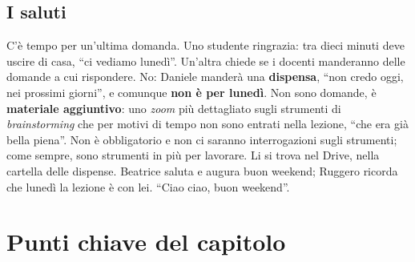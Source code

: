 \subsection{I saluti}
\label{a6:sec:saluti}

C'è tempo per un'ultima domanda. Uno studente ringrazia: tra dieci minuti deve uscire
di casa, ``ci vediamo lunedì''. Un'altra chiede se i docenti manderanno delle domande a
cui rispondere. No: Daniele manderà una \textbf{dispensa}, ``non credo oggi, nei
prossimi giorni'', e comunque \textbf{non è per lunedì}. Non sono domande, è
\textbf{materiale aggiuntivo}: uno \emph{zoom} più dettagliato sugli strumenti di
\emph{brainstorming} che per motivi di tempo non sono entrati nella lezione, ``che era
già bella piena''. Non è obbligatorio e non ci saranno interrogazioni sugli strumenti;
come sempre, sono strumenti in più per lavorare. Li si trova nel Drive, nella
cartella delle dispense. Beatrice saluta e augura buon weekend; Ruggero ricorda che
lunedì la lezione è con lei. ``Ciao ciao, buon weekend''.

\section*{Punti chiave del capitolo}

